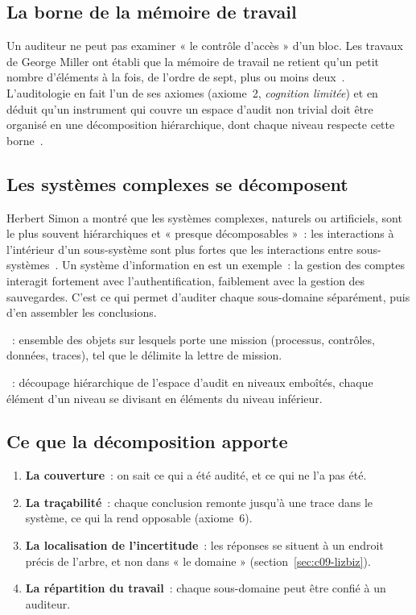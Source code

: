 \subsection{La borne de la mémoire de travail}

Un auditeur ne peut pas examiner « le contrôle d'accès » d'un bloc. Les
travaux de George Miller ont établi que la mémoire de travail ne retient
qu'un petit nombre d'éléments à la fois, de l'ordre de sept, plus ou moins
deux~\cite{miller1956}. L'auditologie en fait l'un de ses axiomes
(axiome~2, \emph{cognition limitée}) et en déduit qu'un instrument qui
couvre un espace d'audit non trivial doit être organisé en une
décomposition hiérarchique, dont chaque niveau respecte cette
borne~\cite{minka2026auditologie}.

\subsection{Les systèmes complexes se décomposent}

Herbert Simon a montré que les systèmes complexes, naturels ou artificiels,
sont le plus souvent hiérarchiques et « presque décomposables »~: les
interactions à l'intérieur d'un sous-système sont plus fortes que les
interactions entre sous-systèmes~\cite{simon1962complexity}. Un système
d'information en est un exemple~: la gestion des comptes interagit
fortement avec l'authentification, faiblement avec la gestion des
sauvegardes. C'est ce qui permet d'auditer chaque sous-domaine
séparément, puis d'en assembler les conclusions.

\begin{boxdef}
~: ensemble des objets sur
lesquels porte une mission (processus, contrôles, données, traces), tel que
le délimite la lettre de mission.

\medskip
{}~: découpage hiérarchique de
l'espace d'audit en niveaux emboîtés, chaque élément d'un niveau se divisant
en éléments du niveau inférieur.
\end{boxdef}

\subsection{Ce que la décomposition apporte}

\begin{enumerate}
    \item \textbf{La couverture}~: on sait ce qui a été audité, et ce qui ne
          l'a pas été.
    \item \textbf{La traçabilité}~: chaque conclusion remonte jusqu'à une
          trace dans le système, ce qui la rend opposable (axiome~6).
    \item \textbf{La localisation de l'incertitude}~: les réponses \NEK{} se
          situent à un endroit précis de l'arbre, et non dans « le domaine »
          (section~\ref{sec:c09-lizbiz}).
    \item \textbf{La répartition du travail}~: chaque sous-domaine peut être
          confié à un auditeur.
\end{enumerate}


